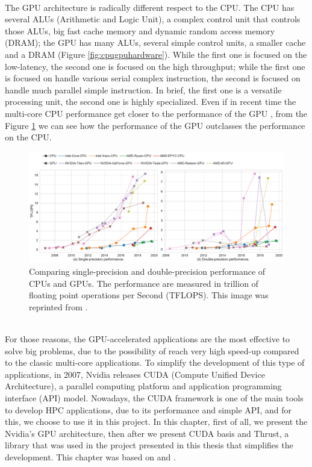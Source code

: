 \\
The GPU architecture is radically different respect to the CPU. The CPU has several ALUs (Arithmetic and Logic Unit), a complex control unit that controls those ALUs, big fast cache memory and dynamic random access memory (DRAM); the GPU has many ALUs, several simple control units, a smaller cache and a DRAM (Figure \ref{fig:cpugpuhardware}). While the first one is focused on the low-latency, the second one is focused on the high throughput;
while the first one is focused on handle various serial complex instruction, the second is focused on handle much parallel simple instruction.
In brief, the first one is a versatile processing unit, the second one is highly specialized.
Even if in recent time the multi-core CPU performance get closer to the performance of the GPU \cite{gpucpu}, from the Figure \ref{fig:cpugpu} we can see how the performance of the GPU outclasses the performance on the CPU.\\
\begin{figure}[h]
	\centering
	\includegraphics[width=1.\linewidth]{0-resources/cpu_gpu}
	\caption{Comparing single-precision and double-precision performance of CPUs and GPUs. The performance are measured in trillion of floating point operations per Second (TFLOPS). This image was reprinted from \cite{gpucpu}.}
	\label{fig:cpugpu}
\end{figure} 
\\	
For those reasons, the GPU-accelerated applications are the most effective to solve big problems, due to the possibility of reach very high speed-up compared to the classic multi-core applications. 
To simplify the development of this type of applications, in 2007, Nvidia releases CUDA (Compute Unified Device Architecture), a parallel computing platform and application programming interface (API) model.
Nowadays, the CUDA framework is one of the main tools to develop HPC applications, due to its performance and simple API, and for this, we choose to use it in this project.
In this chapter, first of all, we present the Nvidia's GPU architecture,  then after we present CUDA basis and Thrust, a library that was used in the project presented in this thesis that simplifies the development. This chapter was based on \cite{turing} and \cite{cuda_manual}.
